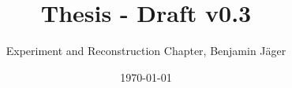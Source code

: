 

\endofdump


% 

\newif\ifIMAGES
\IMAGEStrue




\author{Experiment and Reconstruction Chapter, Benjamin Jäger}
\date{\today}
\title{Thesis - Draft v0.3}





\maketitle




\tableofcontents


\newcommand{\chapterdir}{chapters-outline}
%












